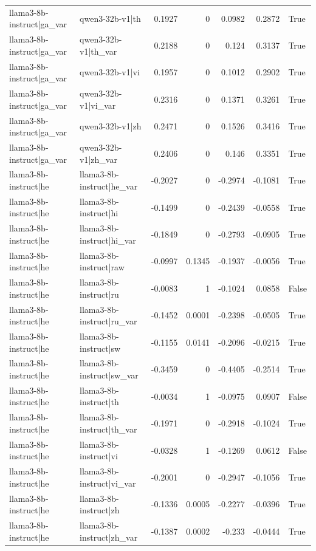 \begin{table}
\begin{tabular}{l l r r r r l}
llama3-8b-instruct|ga_var & qwen3-32b-v1|th & 0.1927 & 0 & 0.0982 & 0.2872 & True \\
llama3-8b-instruct|ga_var & qwen3-32b-v1|th_var & 0.2188 & 0 & 0.124 & 0.3137 & True \\
llama3-8b-instruct|ga_var & qwen3-32b-v1|vi & 0.1957 & 0 & 0.1012 & 0.2902 & True \\
llama3-8b-instruct|ga_var & qwen3-32b-v1|vi_var & 0.2316 & 0 & 0.1371 & 0.3261 & True \\
llama3-8b-instruct|ga_var & qwen3-32b-v1|zh & 0.2471 & 0 & 0.1526 & 0.3416 & True \\
llama3-8b-instruct|ga_var & qwen3-32b-v1|zh_var & 0.2406 & 0 & 0.146 & 0.3351 & True \\
llama3-8b-instruct|he & llama3-8b-instruct|he_var & -0.2027 & 0 & -0.2974 & -0.1081 & True \\
llama3-8b-instruct|he & llama3-8b-instruct|hi & -0.1499 & 0 & -0.2439 & -0.0558 & True \\
llama3-8b-instruct|he & llama3-8b-instruct|hi_var & -0.1849 & 0 & -0.2793 & -0.0905 & True \\
llama3-8b-instruct|he & llama3-8b-instruct|raw & -0.0997 & 0.1345 & -0.1937 & -0.0056 & True \\
llama3-8b-instruct|he & llama3-8b-instruct|ru & -0.0083 & 1 & -0.1024 & 0.0858 & False \\
llama3-8b-instruct|he & llama3-8b-instruct|ru_var & -0.1452 & 0.0001 & -0.2398 & -0.0505 & True \\
llama3-8b-instruct|he & llama3-8b-instruct|sw & -0.1155 & 0.0141 & -0.2096 & -0.0215 & True \\
llama3-8b-instruct|he & llama3-8b-instruct|sw_var & -0.3459 & 0 & -0.4405 & -0.2514 & True \\
llama3-8b-instruct|he & llama3-8b-instruct|th & -0.0034 & 1 & -0.0975 & 0.0907 & False \\
llama3-8b-instruct|he & llama3-8b-instruct|th_var & -0.1971 & 0 & -0.2918 & -0.1024 & True \\
llama3-8b-instruct|he & llama3-8b-instruct|vi & -0.0328 & 1 & -0.1269 & 0.0612 & False \\
llama3-8b-instruct|he & llama3-8b-instruct|vi_var & -0.2001 & 0 & -0.2947 & -0.1056 & True \\
llama3-8b-instruct|he & llama3-8b-instruct|zh & -0.1336 & 0.0005 & -0.2277 & -0.0396 & True \\
llama3-8b-instruct|he & llama3-8b-instruct|zh_var & -0.1387 & 0.0002 & -0.233 & -0.0444 & True \\

\end{tabular}
\end{table}
